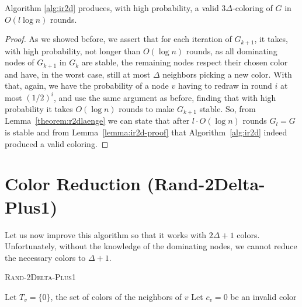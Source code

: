 \begin{theorem}\label{theorem:ir2d}
	Algorithm \ref{alg:ir2d} produces, with high probability, a valid $3\Delta$-coloring of $G$ in $O(l \log n)$ rounds.
\end{theorem}
\begin{proof}
	As we showed before, we assert that for each iteration of $G_{k+1}$, it takes, with high probability, not longer than $O(\log n)$ rounds, as all dominating nodes of $G_{k+1}$ in $G_k$ are stable, the remaining nodes respect their chosen color and have, in the worst case, still at most $\Delta$ neighbors picking a new color. With that, again, we have the probability of a node $v$ having to redraw in round $i$ at most $(1/2)^i$, and use the same argument as before, finding that with high probability it takes $O(\log n)$ rounds to make $G_{k+1}$ stable. So, from Lemma~\ref{theorem:r2dlaenge} we can state that after $l \cdot O( \log n)$ rounds $G_l = G$ is stable and from Lemma~\ref{lemma:ir2d-proof} that Algorithm~\ref{alg:ir2d} indeed produced a valid coloring.
\end{proof}

\section{Color Reduction (Rand-2Delta-Plus1)}

Let us now improve this algorithm so that it works with $2\Delta+1$ colors. Unfortunately, without the knowledge of the dominating nodes, we cannot reduce the necessary colors to $\Delta+1$.

\begin{algorithm}[ht]
\DontPrintSemicolon 
\caption{\textsc{Rand-2Delta-Plus1}}\label{alg:r2d+1}

Let $T_v = \{0\}$, the set of colors of the neighbors of $v$\;
Let $c_v = 0$ be an invalid color\;



\end{algorithm}

